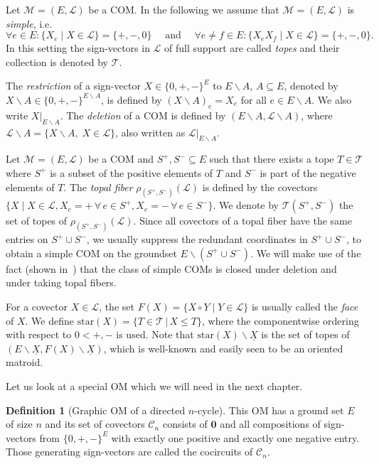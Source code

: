 \documentclass[12pt]{amsart}
\def\Tscr{{\mathcal T}}
\def\Lscr{{\mathcal L}}
\def\M{{\mathcal M}}
\def\cstar{{\mathrm{star}}}
\theoremstyle{plain}
\numberwithin{Lemma}{\DefaultNumberTheoremWithin}
\numberwithin{Claim}{\DefaultNumberTheoremWithin}
\numberwithin{Theorem}{\DefaultNumberTheoremWithin}
\numberwithin{Corollary}{\DefaultNumberTheoremWithin}
\numberwithin{Proposition}{\DefaultNumberTheoremWithin}
\numberwithin{Conjecture}{\DefaultNumberTheoremWithin}
\numberwithin{Situation}{\DefaultNumberTheoremWithin}
\numberwithin{Note}{\DefaultNumberTheoremWithin}
\theoremstyle{definition}
\newtheorem{Definition}{Definition}
\numberwithin{Definition}{\DefaultNumberTheoremWithin}
\theoremstyle{definition}
\numberwithin{Question}{\DefaultNumberTheoremWithin}
\theoremstyle{definition}
\numberwithin{Problem}{\DefaultNumberTheoremWithin}
\theoremstyle{remark} \newtheorem{Remark}{Remark}
\numberwithin{Remark}{\DefaultNumberTheoremWithin}
\theoremstyle{remark}
\numberwithin{Example}{\DefaultNumberTheoremWithin}
\numberwithin{Case}{Lemma}
\numberwithin{Step}{Lemma}
\begin{document}
Let $\M=(E,\mathcal{L})$ be a COM. In the following we assume that $\M=(E,\mathcal{L})$ is \emph{simple}, i.e.\ 
\[\forall e \in E: \{X_e \mid X \in \mathcal{L}\} = \{+,-,0\}\quad \text{ and }\quad \forall e \neq f \in E: \{X_e X_f \mid X \in \mathcal{L}\} = \{+,-,0\}.\] In this setting the sign-vectors in $\mathcal{L}$ of full support are called \emph{topes} and their collection is denoted by $\Tscr$. 

The \emph{restriction} of a sign-vector $X\in\{0,+,-\}^E$ to $E \backslash A$, $A \subseteq E$, denoted by $X\backslash A \in \{0,+,-\}^{E\backslash A}$, is defined by $(X \backslash A)_e = X_e$ for all $e \in E \backslash A$. We also write $X|_{E\backslash A}$. The \emph{deletion} of a COM is defined by $(E \backslash A, \mathcal{L} \backslash A)$, where $\mathcal{L} \backslash A = \{X\backslash A,\; X \in \mathcal{L}\}$, also written as $\mathcal{L}|_{E \backslash A}$.

Let $\M=(E,\mathcal{L})$ be a COM and $S^+,S^- \subseteq E$ such that there exists a tope  $T\in\Tscr$ where $S^+$ is a subset of the positive elements of $T$ and $S^-$ is part of the negative elements of $T$. The \emph{topal fiber} $\rho_{(S^+,S^-)}(\Lscr)$ is defined by the covectors $\{X \mid X\in \mathcal{L},  X_e=+ \,\forall\, e\in S^{+}, X_e=- \,\forall\, e\in S^{-}\}$. We denote by $\Tscr(S^+,S^-)$ the set of topes of $\rho_{(S^+,S^-)}(\Lscr)$.
Since all covectors of a topal fiber have the same entries on $S^+ \cup S^-$, we usually suppress the redundant coordinates in $S^+ \cup S^-$, to obtain a simple COM on the groundset $E \backslash (S^+ \cup S^-)$. We will make use of the fact (shown in~\cite{BCK}) that the class of simple COMs is closed under deletion and under taking topal fibers.


For a covector $X\in \mathcal{L}$, the set $F(X)=\{X\circ Y\mid Y\in\mathcal{L}\}$ is usually called the \emph{face} of $X$. We define $\cstar(X) = \{T \in \Tscr\,|\,X \leq T\}$, where the componentwise ordering with respect to $0<+,-$ is used. Note that $\cstar(X)\backslash
  \underline{X}$ is the set of topes of $(E\backslash
  \underline{X}, F(X)\backslash \underline{X})$, which is well-known and easily seen to be an oriented matroid.

Let us look at a special OM which we will need in the next chapter. 
\begin{Definition}[Graphic OM of a directed $n$-cycle]\label{def:cycle}
This OM has a ground set $E$ of size $n$ and its set of covectors $\mathcal{C}_n$ consists of $\mathbf{0}$ and all compositions of sign-vectors from $\{0,+,-\}^E$ with exactly one positive and exactly one negative entry. Those generating sign-vectors are called the cocircuits of $\mathcal{C}_n$.
\end{Definition}
\end{document}
